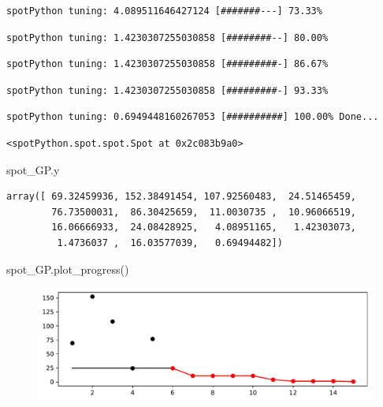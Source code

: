 \documentclass[
  letterpaper,
  DIV=11,
  numbers=noendperiod]{scrreprt}
\newenvironment{Shaded}{\begin{snugshade}}{\end{snugshade}}
\newcommand{\NormalTok}[1]{\textcolor[rgb]{0.00,0.23,0.31}{#1}}
\begin{document}
\begin{verbatim}
spotPython tuning: 4.089511646427124 [#######---] 73.33% 
\end{verbatim}

\begin{verbatim}
spotPython tuning: 1.4230307255030858 [########--] 80.00% 
\end{verbatim}

\begin{verbatim}
spotPython tuning: 1.4230307255030858 [#########-] 86.67% 
\end{verbatim}

\begin{verbatim}
spotPython tuning: 1.4230307255030858 [#########-] 93.33% 
\end{verbatim}

\begin{verbatim}
spotPython tuning: 0.6949448160267053 [##########] 100.00% Done...
\end{verbatim}

\begin{verbatim}
<spotPython.spot.spot.Spot at 0x2c083b9a0>
\end{verbatim}

\begin{Shaded}
\begin{Highlighting}[]
\NormalTok{spot\_GP.y}
\end{Highlighting}
\end{Shaded}

\begin{verbatim}
array([ 69.32459936, 152.38491454, 107.92560483,  24.51465459,
        76.73500031,  86.30425659,  11.0030735 ,  10.96066519,
        16.06666933,  24.08428925,   4.08951165,   1.42303073,
         1.4736037 ,  16.03577039,   0.69494482])
\end{verbatim}

\begin{Shaded}
\begin{Highlighting}[]
\NormalTok{spot\_GP.plot\_progress()}
\end{Highlighting}
\end{Shaded}

\begin{figure}[H]

{\centering \includegraphics{07_spot_ei_files/figure-pdf/cell-35-output-1.pdf}

}

\end{figure}
\end{document}
